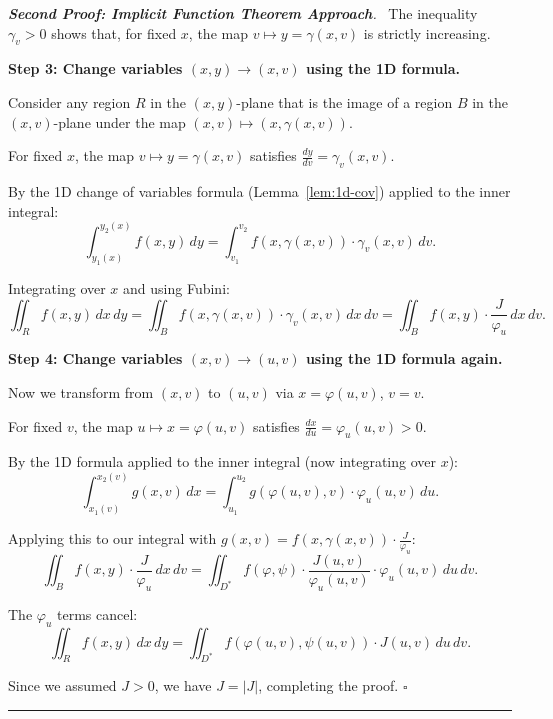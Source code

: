 \documentclass[11pt]{report}
\renewenvironment{proof}[1][Proof]{\par\noindent\textit{#1.}\ }{\hfill$\square$\par\medskip}
\begin{document}
\begin{proof}[\textbf{Second Proof: Implicit Function Theorem Approach}]
The inequality $\gamma_v > 0$ shows that, for fixed $x$, the map $v \mapsto y = \gamma(x, v)$ is strictly increasing.

\textbf{Step 3: Change variables $(x, y) \to (x, v)$ using the 1D formula.}

Consider any region $R$ in the $(x, y)$-plane that is the image of a region $B$ in the $(x, v)$-plane under the map $(x, v) \mapsto (x, \gamma(x, v))$.

For fixed $x$, the map $v \mapsto y = \gamma(x, v)$ satisfies $\frac{dy}{dv} = \gamma_v(x, v)$.

By the 1D change of variables formula (Lemma~\ref{lem:1d-cov}) applied to the inner integral:
\[
\int_{y_1(x)}^{y_2(x)} f(x, y) \, dy = \int_{v_1}^{v_2} f(x, \gamma(x, v)) \cdot \gamma_v(x, v) \, dv.
\]

Integrating over $x$ and using Fubini:
\[
\iint_R f(x, y) \, dx \, dy = \iint_B f(x, \gamma(x, v)) \cdot \gamma_v(x, v) \, dx \, dv = \iint_B f(x, y) \cdot \frac{J}{\varphi_u} \, dx \, dv.
\]

\textbf{Step 4: Change variables $(x, v) \to (u, v)$ using the 1D formula again.}

Now we transform from $(x, v)$ to $(u, v)$ via $x = \varphi(u, v)$, $v = v$.

For fixed $v$, the map $u \mapsto x = \varphi(u, v)$ satisfies $\frac{dx}{du} = \varphi_u(u, v) > 0$.

By the 1D formula applied to the inner integral (now integrating over $x$):
\[
\int_{x_1(v)}^{x_2(v)} g(x, v) \, dx = \int_{u_1}^{u_2} g(\varphi(u, v), v) \cdot \varphi_u(u, v) \, du.
\]

Applying this to our integral with $g(x, v) = f(x, \gamma(x, v)) \cdot \frac{J}{\varphi_u}$:
\[
\iint_B f(x, y) \cdot \frac{J}{\varphi_u} \, dx \, dv = \iint_{D^*} f(\varphi, \psi) \cdot \frac{J(u,v)}{\varphi_u(u,v)} \cdot \varphi_u(u, v) \, du \, dv.
\]

The $\varphi_u$ terms cancel:
\[
\iint_R f(x, y) \, dx \, dy = \iint_{D^*} f(\varphi(u, v), \psi(u, v)) \cdot J(u, v) \, du \, dv.
\]

Since we assumed $J > 0$, we have $J = |J|$, completing the proof.
\end{proof}

\bigskip
\hrule
\bigskip
\end{document}
